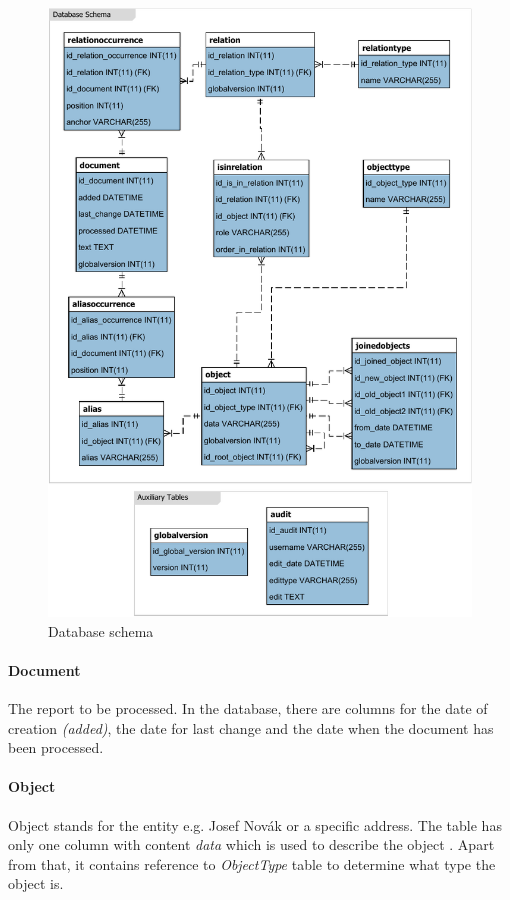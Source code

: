 \begin{figure}[!hp]
        \centering
        \includegraphics{Images/DatabaseSchema}
        \caption{Database schema}
        \label{fig:DatabaseSchema}
\end{figure}

\paragraph{Document} The report to be processed. In the database, there are
columns for the date of  creation \emph{(added)}, the date for last change and
the date when the document has been processed.

\paragraph{Object} Object stands for the entity e.g. Josef Novák or a specific
address.  The table has only one column with content \emph{data} which is used
to describe the object  . Apart
from that, it contains reference to \emph{ObjectType} table to determine what
type the object is.

